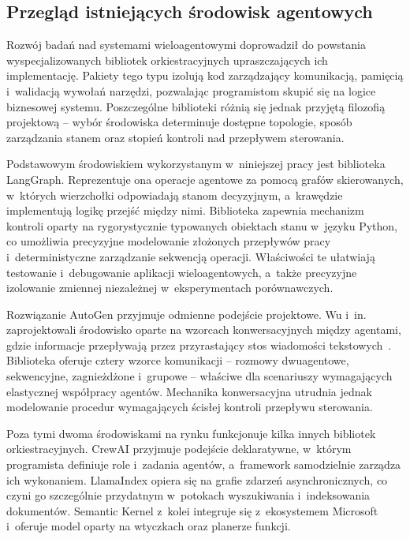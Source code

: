 \clearpage{}

\subsection{Przegląd istniejących środowisk agentowych}\label{subsec:przeglad-srodowisk}

Rozwój badań nad systemami wieloagentowymi doprowadził do powstania
wyspecjalizowanych bibliotek orkiestracyjnych upraszczających ich
implementację. Pakiety tego typu izolują kod zarządzający komunikacją, pamięcią
i~walidacją wywołań narzędzi, pozwalając programistom skupić się na logice
biznesowej systemu. Poszczególne biblioteki różnią się jednak przyjętą
filozofią projektową -- wybór środowiska determinuje dostępne topologie, sposób
zarządzania stanem oraz stopień kontroli nad przepływem sterowania.

Podstawowym środowiskiem wykorzystanym w~niniejszej pracy jest biblioteka
LangGraph. Reprezentuje ona operacje agentowe za pomocą grafów skierowanych,
w~których wierzchołki odpowiadają stanom decyzyjnym, a~krawędzie implementują
logikę przejść między nimi. Biblioteka zapewnia mechanizm kontroli oparty na
rygorystycznie typowanych obiektach stanu w~języku Python, co umożliwia
precyzyjne modelowanie złożonych przepływów pracy i~deterministyczne
zarządzanie sekwencją operacji. Właściwości te ułatwiają testowanie
i~debugowanie aplikacji wieloagentowych, a~także precyzyjne izolowanie zmiennej
niezależnej w~eksperymentach porównawczych.

Rozwiązanie AutoGen przyjmuje odmienne podejście projektowe. Wu i~in.
zaprojektowali środowisko oparte na wzorcach konwersacyjnych między agentami,
gdzie informacje przepływają przez przyrastający stos wiadomości
tekstowych~\cite{wu2024autogen}. Biblioteka oferuje cztery wzorce komunikacji
-- rozmowy dwuagentowe, sekwencyjne, zagnieżdżone i~grupowe -- właściwe dla
scenariuszy wymagających elastycznej współpracy agentów. Mechanika
konwersacyjna utrudnia jednak modelowanie procedur wymagających ścisłej
kontroli przepływu sterowania.

Poza tymi dwoma środowiskami na rynku funkcjonuje kilka innych bibliotek
orkiestracyjnych. CrewAI przyjmuje podejście deklaratywne, w~którym programista
definiuje role i~zadania agentów, a~framework samodzielnie zarządza ich
wykonaniem. LlamaIndex opiera się na grafie zdarzeń asynchronicznych, co czyni
go szczególnie przydatnym w~potokach wyszukiwania i~indeksowania dokumentów.
Semantic Kernel z~kolei integruje się z~ekosystemem Microsoft i~oferuje model
oparty na wtyczkach oraz planerze funkcji.

